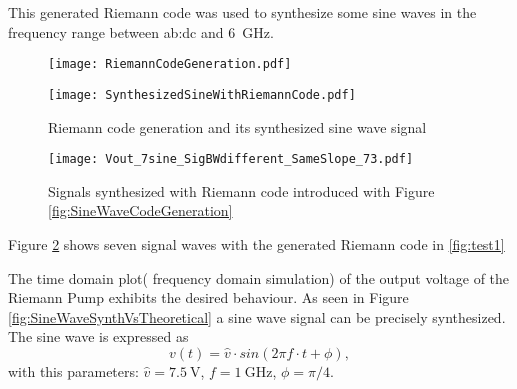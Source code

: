 
This generated Riemann code was used to synthesize some sine waves in the frequency range between \gls{ab:dc} and \SI{6}{\GHz}.

%


\begin{figure}
\centering
\begin{minipage}{.5\textwidth}
  \centering
  \texttt{[image: RiemannCodeGeneration.pdf]}
  \label{fig:test1}
\end{minipage}%
\begin{minipage}{.5\textwidth}
  \centering
  \texttt{[image: SynthesizedSineWithRiemannCode.pdf]}
  \label{fig:test2}
  \caption{Riemann code generation and its synthesized sine wave signal}
\end{minipage}
\end{figure}
%

\begin{figure}[htb!]
   \centering
   \texttt{[image: Vout\_7sine\_SigBWdifferent\_SameSlope\_73.pdf]}
   \caption{Signals synthesized with Riemann code introduced with Figure \ref{fig:SineWaveCodeGeneration}}
   \label{fig:7SignalsSameSlopeInOnePlot}
\end{figure}

Figure \ref{fig:7SignalsSameSlopeInOnePlot} shows seven signal waves with the generated Riemann code in \ref{fig:test1}

The time domain plot( frequency domain simulation) of the output voltage of the Riemann Pump exhibits the desired behaviour. 
As seen in Figure \ref{fig:SineWaveSynthVsTheoretical} a sine wave signal can be precisely synthesized. 
The sine wave is expressed as 
\begin{equation}
	v(t)= \widehat{v} \cdot sin( 2  \pi  f \cdot  t + \phi),
\end{equation}
with this parameters: $\widehat{v} = \SI{7.5}{\volt}$, $f = \SI{1}{\giga \hertz}$, $\phi = \pi / 4$.

